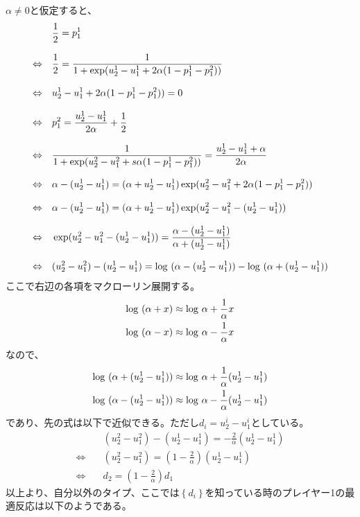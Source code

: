 \documentclass{jsarticle}
\begin{document}
$\alpha \neq 0$と仮定すると、
\begin{align*}
	&\frac{1}{2} = p_1^1\\[8pt]
	\Leftrightarrow\quad&\frac{1}{2} = \frac{1}{1 + \exp(u_2^1 - u_1^1 + 2\alpha(1 - p_1^1 - p_1^2))}\\[8pt]
	\Leftrightarrow\quad &u_2^1 - u_1^1 + 2\alpha(1 - p_1^1 - p_1^2)) = 0\\[8pt]
	\Leftrightarrow\quad &p_1^2 = \frac{u_2^1 - u_1^1}{2\alpha} + \frac{1}{2}\\[8pt]
	\Leftrightarrow\quad &\frac{1}{1 + \exp(u_2^2 - u_1^2 + s\alpha(1 -p_1^1 -p_1^2))} = \frac{u_2^1 - u_1^1 + \alpha}{2\alpha}\\[8pt]
	\Leftrightarrow\quad &\alpha - (u_2^1 - u_1^1) = (\alpha + u_2^1 - u_1^1)\exp(u_2^2 - u_1^2 + 2\alpha(1 - p_1^1 - p_1^2))\\[8pt]
	\Leftrightarrow\quad &\alpha - (u_2^1 - u_1^1) = (\alpha + u_2^1 - u_1^1)\exp(u_2^2 - u_1^2 - (u_2^1 - u_1^1))\\[8pt]
	\Leftrightarrow\quad &\exp(u_2^2 - u_1^2 - (u_2^1 - u_1^1)) = \frac{\alpha - (u_2^1 - u_1^1)}{\alpha + (u_2^1 - u_1^1)}\\[8pt]
	\Leftrightarrow\quad &(u_2^2 - u_1^2) - (u_2^1 - u_1^1) = {\rm log}\ (\alpha - (u_2^1 - u_1^1)) - {\rm log}\ (\alpha + (u_2^1 - u_1^1))
\end{align*}
ここで右辺の各項をマクローリン展開する。
\begin{align*}
	&{\rm log}\ (\alpha + x) \approx {\rm log}\ \alpha + \frac{1}{\alpha} x\\
	&{\rm log}\ (\alpha - x) \approx {\rm log}\ \alpha - \frac{1}{\alpha} x
\end{align*}
なので、
\begin{align*}
	&{\rm log}\ (\alpha + (u_2^1 - u_1^1)) \approx {\rm log}\ \alpha + \frac{1}{\alpha} (u_2^1 - u_1^1)\\
	&{\rm log}\ (\alpha - (u_2^1 - u_1^1)) \approx {\rm log}\ \alpha - \frac{1}{\alpha} (u_2^1 - u_1^1)
\end{align*}
であり、先の式は以下で近似できる。ただし$d_i = u_2^i - u_1^i$としている。
\begin{align*}
	&(u_2^2 - u_1^2) - (u_2^1 - u_1^1) = -\frac{2}{\alpha} (u_2^1 - u_1^1)\\
	\Leftrightarrow\quad &(u_2^2 - u_1^2) = (1-\frac{2}{\alpha})(u_2^1 - u_1^1)\\
	\Leftrightarrow\quad &d_2 = (1-\frac{2}{\alpha})d_1
\end{align*}
以上より、自分以外のタイプ、ここでは$\left\{ d_i\right\}$を知っている時のプレイヤー1の最適反応は以下のようである。
\end{document}
